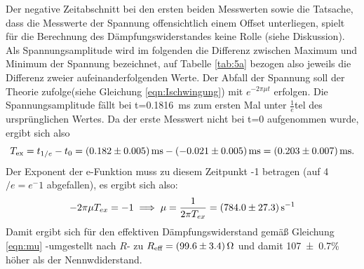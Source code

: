 Der negative Zeitabschnitt bei den ersten beiden Messwerten
sowie die Tatsache, dass
die Messwerte der Spannung
offensichtlich einem Offset unterliegen,
spielt für die Berechnung des Dämpfungswiderstandes keine Rolle
(siehe Diskussion).
Als Spannungsamplitude wird im folgenden die Differenz zwischen Maximum und
Minimum der Spannung bezeichnet, auf Tabelle
\ref{tab:5a} bezogen also jeweils die
Differenz zweier aufeinanderfolgenden Werte.
Der Abfall der Spannung soll der Theorie
zufolge(siehe Gleichung \ref{eqn:Ischwingung})
mit $e^{-2\pi\mu t}$ erfolgen. Die Spannungsamplitude fällt bei t=\SI{0.1816}
{\milli\second} zum ersten Mal unter
$\frac{1}{e}$tel des ursprünglichen Wertes.
Da der erste Messwert
nicht bei t=0 aufgenommen wurde, ergibt sich also
\begin{equation}
T_\text{ex} = t_{1/e} - t_0 = \SI{0.182 +- 0.005}{\milli\second}
- \SI{-0.021+-0.005}{\milli\second}=\SI{0.203 +- 0.007}{\milli\second}.
\end{equation}
Der Exponent der e-Funktion muss zu diesem Zeitpunkt -1 betragen (auf 4$/e=e^-1$
abgefallen), es ergibt sich also:
\begin{equation}
  -2\pi\mu T_{ex} = -1 \\
  \implies \mu = \frac{1}{2\pi T_{ex}} =  \SI{784.0 +- 27.3}{\per\second}
\end{equation}
Damit ergibt sich für den effektiven Dämpfungswiderstand gemäß
Gleichung \ref{eqn:mu} -umgestellt nach $R$- zu $R_\text{eff}= \SI{99.6+-3.4}{\ohm}$
und damit \num{107+-0.7}\% höher als der Nennwdiderstand.
